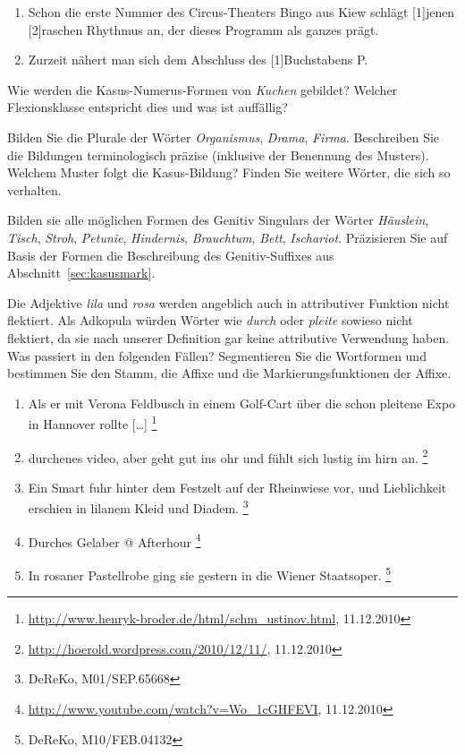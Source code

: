 \begin{sloppypar}
\begin{enumerate}
  \Np

  \item Schon die erste Nummer des Circus-Theaters Bingo aus Kiew schlägt [1]jenen [2]raschen Rhythmus an, der dieses Programm als ganzes prägt.
  \item Zurzeit nähert man sich dem Abschluss des [1]Buchstabens P.
\end{enumerate}

\Uebung \label{u82} Wie werden die Kasus-Numerus-Formen von \textit{Kuchen} gebildet?
Welcher Flexionsklasse entspricht dies und was ist auffällig?

\Uebung \label{u83} Bilden Sie die Plurale der Wörter \textit{Organismus}, \textit{Drama}, \textit{Firma}.
Beschreiben Sie die Bildungen terminologisch präzise (inklusive der Benennung des Musters).
Welchem Muster folgt die Kasus-Bildung?
Finden Sie weitere Wörter, die sich so verhalten.

\Uebung \label{u83a} Bilden sie alle möglichen Formen des Genitiv Singulars der Wörter \textit{Häuslein}, \textit{Tisch}, \textit{Stroh}, \textit{Petunie}, \textit{Hindernis}, \textit{Brauchtum}, \textit{Bett}, \textit{Ischariot}.
Präzisieren Sie auf Basis der Formen die Beschreibung des Genitiv-Suffixes aus Abschnitt~\ref{sec:kasusmark}.

\Uebung \label{u84} Die Adjektive \textit{lila} und \textit{rosa} werden angeblich auch in attributiver Funktion nicht flektiert.
Als Adkopula würden Wörter wie \textit{durch} oder \textit{pleite} sowieso nicht flektiert, da sie nach unserer Definition gar keine attributive Verwendung haben.
Was passiert in den folgenden Fällen?
Segmentieren Sie die Wortformen und bestimmen Sie den Stamm, die Affixe und die Markierungsfunktionen der Affixe.

\begin{enumerate}\Lf
  \item Als er mit Verona Feldbusch in einem Golf-Cart über die schon pleitene Expo in Hannover rollte [\ldots]%
  \footnote{\raggedright{\url{http://www.henryk-broder.de/html/schm_ustinov.html}, 11.12.2010}}
  \item durchenes video, aber geht gut ins ohr und fühlt sich lustig im hirn an.%
  \footnote{\raggedright{\url{http://hoerold.wordpress.com/2010/12/11/}, 11.12.2010}}
  \item Ein Smart fuhr hinter dem Festzelt auf der Rheinwiese vor, und Lieblichkeit erschien in lilanem Kleid und Diadem.%
  \footnote{\raggedright{DeReKo, M01\slash SEP.65668}}
  \item Durches Gelaber @ Afterhour%
  \footnote{\raggedright{\url{http://www.youtube.com/watch?v=Wo_1cGHFEVI}, 11.12.2010}}
  \item In rosaner Pastellrobe ging sie gestern in die Wiener Staatsoper.%
  \footnote{\raggedright{DeReKo, M10\slash FEB.04132}}
\end{enumerate}


\end{sloppypar}
